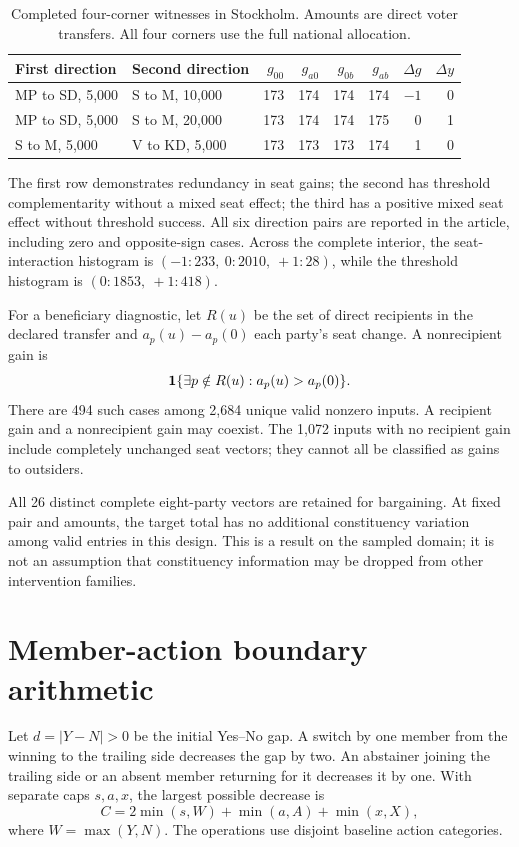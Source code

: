 \begin{table}[htbp]\centering
\caption{Completed four-corner witnesses in Stockholm. Amounts are direct voter transfers. All four corners use the full national allocation.}
\begin{tabular}{llrrrrrr}
\toprule
First direction & Second direction & \(g_{00}\)&\(g_{a0}\)&\(g_{0b}\)&\(g_{ab}\)&\(\Delta g\)&\(\Delta y\)\\
\midrule
MP to SD, 5,000 & S to M, 10,000 &173&174&174&174&$-1$&0\\
MP to SD, 5,000 & S to M, 20,000 &173&174&174&175&0&1\\
S to M, 5,000 & V to KD, 5,000 &173&173&173&174&1&0\\
\bottomrule
\end{tabular}
\end{table}

The first row demonstrates redundancy in seat gains; the second has threshold complementarity without a mixed seat effect; the third has a positive mixed seat effect without threshold success. All six direction pairs are reported in the article, including zero and opposite-sign cases. Across the complete interior, the seat-interaction histogram is \((-1:233,\ 0:2010,\ +1:28)\), while the threshold histogram is \((0:1853,\ +1:418)\).

For a beneficiary diagnostic, let \(R(u)\) be the set of direct recipients in the declared transfer and \(a_p(u)-a_p(0)\) each party's seat change. A nonrecipient gain is
\[
\mathbf{1}\{\exists p\notin R(u):a_p(u)>a_p(0)\}.
\]
There are 494 such cases among 2,684 unique valid nonzero inputs. A recipient gain and a nonrecipient gain may coexist. The 1,072 inputs with no recipient gain include completely unchanged seat vectors; they cannot all be classified as gains to outsiders.

All 26 distinct complete eight-party vectors are retained for bargaining. At fixed pair and amounts, the target total has no additional constituency variation among valid entries in this design. This is a result on the sampled domain; it is not an assumption that constituency information may be dropped from other intervention families.

\section{Member-action boundary arithmetic}

Let \(d=|Y-N|>0\) be the initial Yes--No gap. A switch by one member from the winning to the trailing side decreases the gap by two. An abstainer joining the trailing side or an absent member returning for it decreases it by one. With separate caps \(s,a,x\), the largest possible decrease is
\[
C=2\min(s,W)+\min(a,A)+\min(x,X),
\]
where \(W=\max(Y,N)\). The operations use disjoint baseline action categories.

